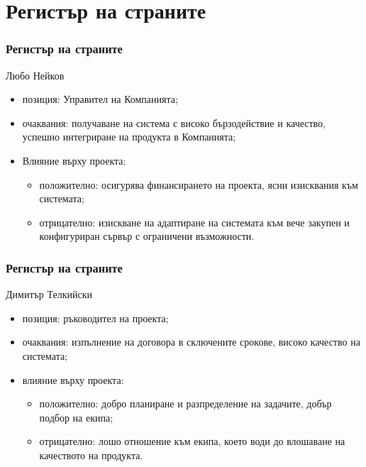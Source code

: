 \documentclass{beamer}
\begin{document}
\section{Регистър на страните}
\begin{frame}
    \frametitle{Регистър на страните}
    \begin{block}{Любо Нейков}
        \begin{itemize}
            \item позиция: Управител на Компанията;
            \item очаквания: получаване на система с високо бързодействие и качество,
                успешно интегриране на продукта в Компанията;
            \item Влияние върху проекта:
                \begin{itemize}
                    \item положително: осигурява финансирането на проекта, ясни изисквания към системата;
                    \item отрицателно: изискване на адаптиране на системата
                    към вече закупен и конфигуриран сървър с ограничени
                    възможности.
                \end{itemize}
        \end{itemize}
    \end{block}
\end{frame}

\begin{frame}
    \frametitle{Регистър на страните}
    \begin{block}{Димитър Телкийски}
        \begin{itemize}
            \item позиция: ръководител на проекта;
            \item очаквания: изпълнение на договора в сключените срокове, високо качество на системата;
            \item влияние върху проекта:
                \begin{itemize}
                    \item положително: добро планиране и разпределение на
                    задачите, добър подбор на екипа;
                    \item отрицателно: лошо отношение към екипа, което води
                    до влошаване на качеството на продукта.
                \end{itemize}
        \end{itemize}
    \end{block}
\end{frame}
\end{document}
